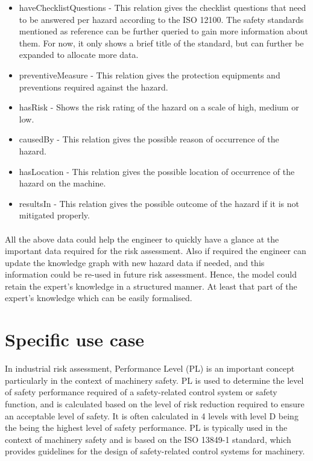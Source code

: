\begin{itemize}
    \item haveChecklistQuestions - This relation gives the checklist questions that need to be answered per hazard according to the ISO 12100. The safety standards mentioned as reference can be further queried to gain more information about them. For now, it only shows a brief title of the standard, but can further be expanded to allocate more data.
    \item preventiveMeasure - This relation gives the protection equipments and preventions required against the hazard. 
    \item hasRisk - Shows the risk rating of the hazard on a scale of high, medium or low.
    \item causedBy - This relation gives the possible reason of occurrence of the hazard.
    \item hasLocation - This relation gives the possible location of occurrence of the hazard on the machine.
    \item resultsIn - This relation gives the possible outcome of the hazard if it is not mitigated properly.
\end{itemize}

\bigskip\bigskip {}

\paragraph{} All the above data could help the engineer to quickly have a glance at the important data required for the risk assessment. Also if required the engineer can update the knowledge graph with new hazard data if needed, and this information could be re-used in future risk assessment. Hence, the model could retain the expert's knowledge in a structured manner. At least that part of the expert's knowledge which can be easily formalised. 

\section{Specific use case} \label{specific_use}
In industrial risk assessment, Performance Level (PL) is an important concept particularly in the context of machinery safety. PL is used to determine the level of safety performance required of a safety-related control system or safety function, and is calculated based on the level of risk reduction required to ensure an acceptable level of safety. It is often calculated in 4 levels with level D being the being the highest level of safety performance. PL is typically used in the context of machinery safety and is based on the ISO 13849-1 standard, which provides guidelines for the design of safety-related control systems for machinery. %

